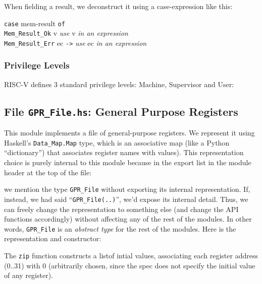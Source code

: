 \documentclass[11pt]{article}
\newcommand{\hm}{\hspace*{1em}}
\newcommand{\hmmm}{\hspace*{3em}}
\begin{document}
When fielding a result, we deconstruct it using a case-expression like this:
\begin{tabbing}
\hmmm \= {\tt case} mem-result {\tt of} \\
      \> \hm \= {\tt Mem\_Result\_Ok} v \hm {\tt ->} \= \emph{use} v \emph{in an expression} \\
      \>     \> {\tt Mem\_Result\_Err} ec   {\tt ->} \> \emph{use} ec \emph{in an expression}
\end{tabbing}


\subsubsection{Privilege Levels}

RISC-V defines 3 standard privilege levels: Machine, Supervisor and User:




\subsection{File {\tt GPR\_File.hs}: General Purpose Registers}

\label{sec_gprs}

This module implements a file of general-purpose registers.  We
represent it using Haskell's \verb|Data_Map.Map| type, which is an
associative map (like a Python ``dictionary'') that associates
register names with values).  This representation choice is purely
internal to this module because in the export list in the module
header at the top of the file:



we mention the type \verb|GPR_File| without exporting its internal
representation.  If, instead, we had said ``\verb|GPR_File(..)|'',
we'd expose its internal detail.  Thus, we can freely change the
representation to something else (and change the API functions
accordingly) without affecting any of the rest of the modules.  In
other words, \verb|GPR_File| is an \emph{abstract type} for the rest
of the modules.  Here is the representation and constructor:



The \verb|zip| function constructs a listof intial values, associating
each register address (0..31) with 0 (arbitrarily chosen, since the
spec does not specify the initial value of any register).
\end{document}
